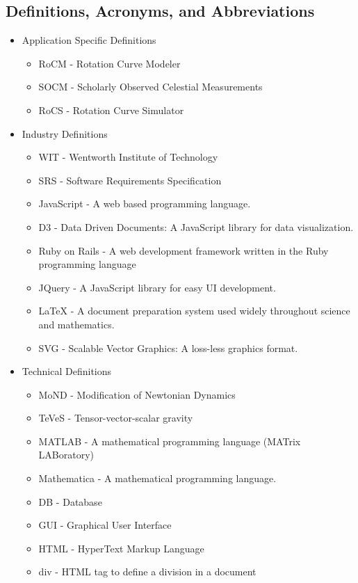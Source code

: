 \documentclass[titlepage]{article}
\begin{document}
\subsection{Definitions, Acronyms, and Abbreviations}
\begin{itemize}
	\item Application Specific Definitions
	\begin{itemize}
		\item RoCM - Rotation Curve Modeler
		\item SOCM - Scholarly Observed Celestial Measurements
		\item RoCS - Rotation Curve Simulator
	\end{itemize}
	\item Industry Definitions
	\begin{itemize}
		\item WIT - Wentworth Institute of Technology
		\item SRS - Software Requirements Specification
		\item JavaScript - A web based programming language.
		\item D3 - Data Driven Documents: A JavaScript library for data visualization.
		\item Ruby on Rails - A web development framework written in the Ruby programming language
		\item JQuery - A JavaScript library for easy UI development.
		\item LaTeX - A document preparation system used widely throughout science and mathematics.
		\item SVG - Scalable Vector Graphics: A loss-less graphics format.
	\end{itemize}
	\item Technical Definitions
	\begin{itemize}
        \item MoND - Modification of Newtonian Dynamics
		\item TeVeS - Tensor-vector-scalar gravity
		\item MATLAB - A mathematical programming language (MATrix LABoratory) 
		\item Mathematica - A mathematical programming language.
		\item DB - Database
		\item GUI - Graphical User Interface
		\item HTML - HyperText Markup Language
		\item div - HTML tag to define a division in a document
	\end{itemize}
\end{itemize}
\end{document}
